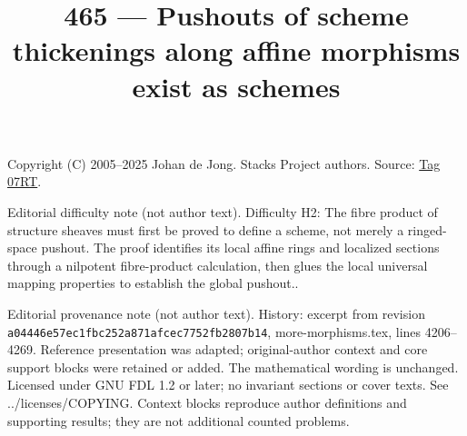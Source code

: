 \documentclass{amsart}
\theoremstyle{plain}
\theoremstyle{definition}
\theoremstyle{remark}
\numberwithin{equation}{subsection}
\begin{document}
\title[Stacks Project, Tag 07RT]{465 --- Pushouts of scheme thickenings along affine morphisms exist as schemes}
\maketitle
\noindent Copyright (C) 2005--2025 Johan de Jong. Stacks Project authors. Source: \href{https://stacks.math.columbia.edu/tag/07RT}{Tag 07RT}.

\noindent Editorial difficulty note (not author text). Difficulty H2: The fibre product of structure sheaves must first be proved to define a scheme, not merely a ringed-space pushout. The proof identifies its local affine rings and localized sections through a nilpotent fibre-product calculation, then glues the local universal mapping properties to establish the global pushout..

\noindent Editorial provenance note (not author text). History: excerpt from revision \texttt{a0444\allowbreak 6e57e\allowbreak c1fbc\allowbreak 252a8\allowbreak 71afc\allowbreak ec775\allowbreak 2fb28\allowbreak 07b14}, more-morphisms.tex, lines 4206--4269. Reference presentation was adapted; original-author context and core support blocks were retained or added. The mathematical wording is unchanged. Licensed under GNU FDL 1.2 or later; no invariant sections or cover texts. See ../licenses/COPYING. Context blocks reproduce author definitions and supporting results; they are not additional counted problems.
\end{document}
